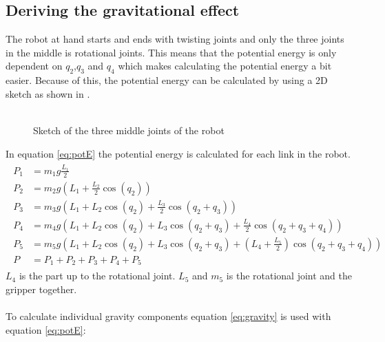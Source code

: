  \subsection{Deriving the gravitational effect}
 The robot at hand starts and ends with twisting joints and only the three joints in the middle is rotational joints. This means that the potential energy is only dependent on $q_2$,$q_3$ and $q_4$ which makes calculating the potential energy a bit easier. Because of this, the potential energy can be calculated by using a 2D sketch as shown in .\\\\
\begin{figure}[htbp]
    \centering
    
    \caption{Sketch of the three middle joints of the robot}
    \label{draw:pot-rob}
\end{figure}
In equation \eqref{eq:potE} the potential energy is calculated for each link in the robot. 
 \begin{align}
    \begin{split}\label{eq:potE}
        P_1 &= m_1g\frac{L_1}{2}
        \\
        P_2 &= m_2g\left(L_1 + \frac{L_2}{2}\cos{(q_2)}\right)
        \\
        P_3 &= m_3g\left(L_1 +  L_2 \cos{(q_2)} + \frac{L_3}{2}\cos{(q_2 + q_3)} \right)
        \\
        P_4 &= m_4g\left(L_1 +  L_2 \cos{(q_2)} + L_3\cos{(q_2 + q_3)} + \frac{L_4}{2}\cos{(q_2+q_3+q_4)} \right)
        \\
        P_5 &=m_5g\left(L_1 +  L_2 \cos{(q_2)} + L_3\cos{(q_2 + q_3)} + \left(L_4 + \frac{L_5}{2} \right)\cos{(q_2+q_3+q_4)} \right)
        \\
        P &= P_1 + P_2 + P_3 + P_4 + P_5
    \end{split}   
 \end{align}    
$L_4$ is the part up to the rotational joint. $L_5$ and $m_5$ is the rotational joint and the gripper together.\\\\
To calculate individual gravity components equation \eqref{eq:gravity} is used with equation \eqref{eq:potE}:

